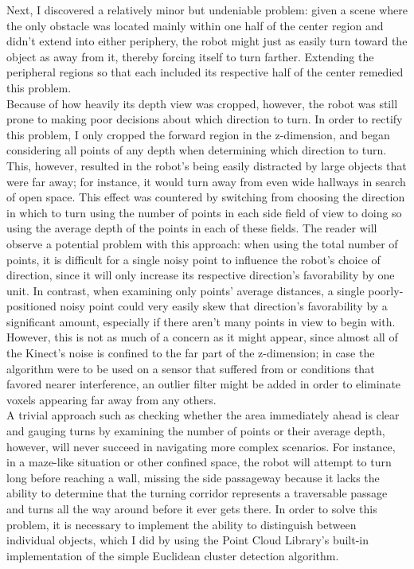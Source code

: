 \documentclass[12pt]{report}
\begin{document}
Next, I discovered a relatively minor but undeniable problem: given a scene where the only obstacle was located mainly within one half of the center region and didn't extend into either periphery, the robot might just as easily turn toward the object as away from it, thereby forcing itself to turn farther.  Extending the peripheral regions so that each included its respective half of the center remedied this problem. \\
Because of how heavily its depth view was cropped, however, the robot was still prone to making poor decisions about which direction to turn.  In order to rectify this problem, I only cropped the forward region in the z-dimension, and began considering all points of any depth when determining which direction to turn.  This, however, resulted in the robot's being easily distracted by large objects that were far away; for instance, it would turn away from even wide hallways in search of open space.  This effect was countered by switching from choosing the direction in which to turn using the number of points in each side field of view to doing so using the average depth of the points in each of these fields.  The reader will observe a potential problem with this approach: when using the total number of points, it is difficult for a single noisy point to influence the robot's choice of direction, since it will only increase its respective direction's favorability by one unit.  In contrast, when examining only points' average distances, a single poorly-positioned noisy point could very easily skew that direction's favorability by a significant amount, especially if there aren't many points in view to begin with.  However, this is not as much of a concern as it might appear, since almost all of the Kinect's noise is confined to the far part of the z-dimension; in case the algorithm were to be used on a sensor that suffered from or conditions that favored nearer interference, an outlier filter might be added in order to eliminate voxels appearing far away from any others. \\
A trivial approach such as checking whether the area immediately ahead is clear and gauging turns by examining the number of points or their average depth, however, will never succeed in navigating more complex scenarios.  For instance, in a maze-like situation or other confined space, the robot will attempt to turn long before reaching a wall, missing the side passageway because it lacks the ability to determine that the turning corridor represents a traversable passage and turns all the way around before it ever gets there.  In order to solve this problem, it is necessary to implement the ability to distinguish between individual objects, which I did by using the Point Cloud Library's built-in implementation of the simple Euclidean cluster detection algorithm. \\
\end{document}
